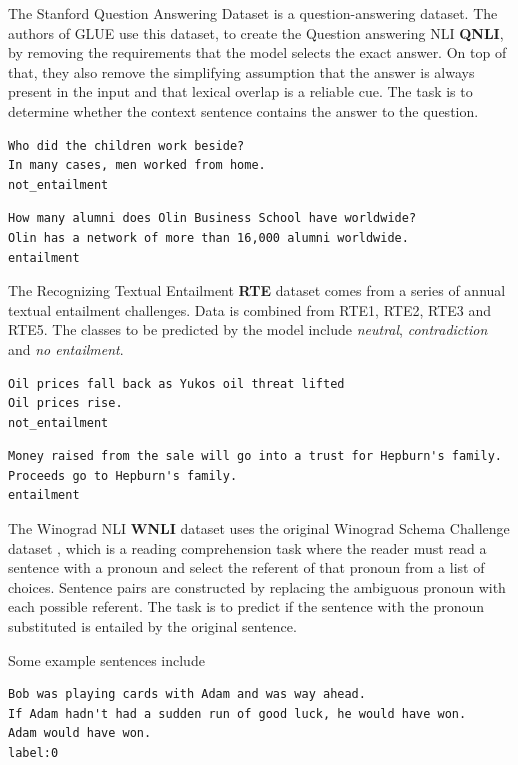 \documentclass[a4paper,12pt,twoside,openright]{report}
\begin{document}
The Stanford Question Answering Dataset is a question-answering dataset. 
The authors of GLUE use this dataset, to create the Question answering NLI \textbf{QNLI}, by removing the requirements that the model selects the exact answer.
On top of that, they also remove the simplifying assumption that the answer is always present in the input and that lexical overlap is a reliable cue.
The task is to determine whether the context sentence contains the answer to the question. 

\begin{verbatim}
Who did the children work beside?	
In many cases, men worked from home.
not_entailment
\end{verbatim}

\begin{verbatim}
How many alumni does Olin Business School have worldwide?
Olin has a network of more than 16,000 alumni worldwide.
entailment
\end{verbatim}


The Recognizing Textual Entailment \textbf{RTE} dataset comes from a series of annual textual entailment challenges. 
Data is combined from RTE1, RTE2, RTE3 and RTE5. 
The classes to be predicted by the model include \textit{neutral}, \textit{contradiction} and \textit{no entailment}.


\begin{verbatim}
Oil prices fall back as Yukos oil threat lifted	
Oil prices rise.
not_entailment
\end{verbatim}

\begin{verbatim}
Money raised from the sale will go into a trust for Hepburn's family.
Proceeds go to Hepburn's family.	
entailment
\end{verbatim}


The Winograd NLI \textbf{WNLI} dataset uses the original Winograd Schema Challenge dataset \cite{levesque12}, which is a reading comprehension task where the reader must read a sentence with a pronoun and select the referent of that pronoun from a list of choices. 
Sentence pairs are constructed by replacing the ambiguous pronoun with each possible referent.
The task is to predict if the sentence with the pronoun substituted is entailed by the original sentence.

Some example sentences include 

\begin{verbatim}
Bob was playing cards with Adam and was way ahead.
If Adam hadn't had a sudden run of good luck, he would have won.	Adam would have won.
label:0
\end{verbatim}
\end{document}
